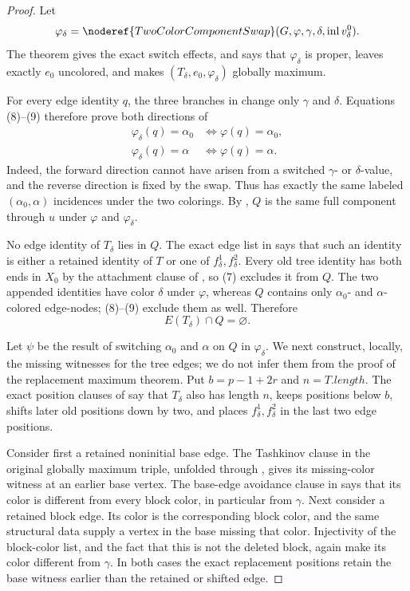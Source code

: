 \begin{proof}
Let
\[
 \varphi_\delta=\noderef{TwoColorComponentSwap}
   (G,\varphi,\gamma,\delta,\operatorname{inl}v^0_\delta).
\]
The theorem  gives the exact switch
effects, and  says that
$\varphi_\delta$ is proper, leaves exactly $e_0$ uncolored, and makes
$(T_\delta,e_0,\varphi_\delta)$ globally maximum.

For every edge identity $q$, the three branches in
 change only $\gamma$ and $\delta$.
Equations (8)--(9) therefore prove both directions of
\[
 \begin{aligned}
 \varphi_\delta(q)=\alpha_0&\iff\varphi(q)=\alpha_0,\\
 \varphi_\delta(q)=\alpha&\iff\varphi(q)=\alpha.
 \end{aligned}                                             \tag{10}
\]
Indeed, the forward direction cannot have arisen from a switched
$\gamma$- or $\delta$-value, and the reverse direction is fixed by the
swap.  Thus  has exactly the same labeled
$(\alpha_0,\alpha)$ incidences under the two colorings.  By
, $Q$ is the same full component through $u$
under $\varphi$ and $\varphi_\delta$.

No edge identity of $T_\delta$ lies in $Q$.  The exact edge list in
 says that such an identity is either a
retained identity of $T$ or one of $f^1_\delta,f^2_\delta$.  Every old tree
identity has both ends in $X_0$ by the attachment clause of
, so (7) excludes it from $Q$.  The two appended
identities have color $\delta$ under $\varphi$, whereas $Q$ contains only
$\alpha_0$- and $\alpha$-colored edge-nodes; (8)--(9) exclude them as
well.  Therefore
\[
 E(T_\delta)\cap Q=\varnothing.                             \tag{11}
\]

Let $\psi$ be the result of switching $\alpha_0$ and $\alpha$ on $Q$ in
$\varphi_\delta$.  We next construct, locally, the missing witnesses for
the tree edges; we do not infer them from the proof of the replacement
maximum theorem.  Put $b=p-1+2r$ and $n=T.length$.  The exact position
clauses of  say that $T_\delta$ also has
length $n$, keeps positions below $b$, shifts later old positions down by
two, and places $f^1_\delta,f^2_\delta$ in the last two edge positions.

Consider first a retained noninitial base edge.  The Tashkinov clause in
the original globally maximum triple, unfolded through
, gives its missing-color witness at an earlier base
vertex.  The base-edge avoidance clause in
 says that its color is different
from every block color, in particular from $\gamma$.  Next consider a
retained block edge.  Its color is the corresponding block color, and the
same structural data supply a vertex in the base missing that color.
Injectivity of the block-color list, and the fact that this is not the
deleted block, again make its color different from $\gamma$.  In both
cases the exact replacement positions retain the base witness earlier than
the retained or shifted edge.


\end{proof}
